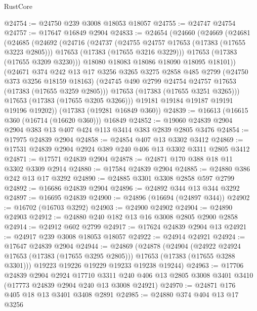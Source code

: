 \begin{lexlean}{RustCore}
\begin{coremodule}
@24754 := @24750 @239 @3008 @18053 @18057
@24755 := @24747 @24754
@24757 := @17647 @16849 @2904
@24833 := @24654
    (@24660
      (@24669
        (@24681
          (@24685
            (@24692
              (@24716
                (@24737
                  (@24755 @24757 @17653 (@17383 (@17655 @3223 @2805)))
                  @17653
                  (@17383 (@17655 @3216 @3229)))
                @17653
                (@17383 (@17655 @3209 @3230)))
              @18080
              @18083
              @18086
              @18090
              @18095
              @18101))
          (@24671
            @374
            @242
            @13
            @17
            @3256
            @3265
            @3275
            @2858
            @485
            @2799
            (@24750 @373 @3256 @18159 @18163)
            (@24745 @490 @2799 @24754 @24757 @17653 (@17383 (@17655 @3259 @2805)))
            @17653
            (@17383 (@17655 @3251 @3265)))
          @17653
          (@17383 (@17655 @3205 @3266)))
        @19181
        @19184
        @19187
        @19191
        @19196
        @19202))
    (@17383 (@19281 @16849 @360))
@24839 := @16613 (@16615 @360 (@16714 (@16620 @360))) @16849
@24852 := @19060 @24839 @2904 @2904 @383 @13 @407 @424 @113 @3414 @383 @2839 @2805 @3476
@24854 := @17975 @24839 @2904
@24858 := @24854 @407 @13 @3302 @3412
@24869 := @17531 @24839 @2904 @2924 @389 @240 @406 @13 @3302 @3311 @2805 @3412
@24871 := @17571 @24839 @2904
@24878 := @24871 @170 @388 @18 @11 @3302 @3309 @2914
@24880 := @17584 @24839 @2904
@24885 := @24880 @386 @242 @13 @17 @3292
@24890 := @24885 @3301 @3308 @2858 @597 @2799
@24892 := @16686 @24839 @2904
@24896 := @24892 @344 @13 @344 @3292
@24897 := @16695 @24839
@24900 := @24896 (@16694 (@24897 @344))
@24902 := @16702 (@16703 @3292)
@24903 := @24900 @24902
@24904 := @24890 @24903
@24912 := @24880 @240 @182 @13 @16 @3008 @2805 @2900 @2858
@24914 := @24912 @602 @2799
@24917 := @17624 @24839 @2904 @13
@24921 := @24917 @239 @3008 @18053 @18057
@24922 := @24914 @24921
@24924 := @17647 @24839 @2904
@24944 := @24869
    (@24878
      (@24904
        (@24922 @24924 @17653 (@17383 (@17655 @3295 @2805)))
        @17653
        (@17383 (@17655 @3288 @3301)))
      @19223
      @19226
      @19229
      @19233
      @19238
      @19244)
@24963 := @17706
    @24839
    @2904
    @2924
    @17710
    @3311
    @240
    @406
    @13
    @2805
    @3008
    @3401
    @3410
    (@17773 @24839 @2904 @240 @13 @3008 @24921)
@24970 := @24871 @176 @405 @18 @13 @3401 @3408 @2891
@24985 := @24880
    @374
    @404
    @13
    @17
    @3256

\end{coremodule}
\end{lexlean}
